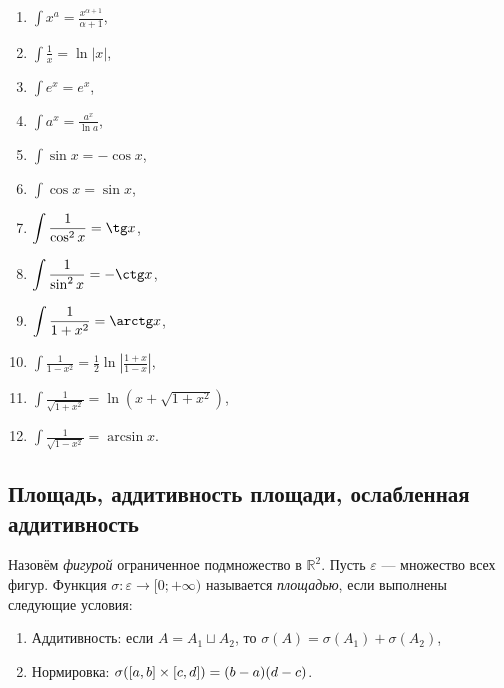 \begin{multicols}{2}
	\begin{enumerate}
		\item \(\displaystyle \int x^a = \frac{x^{\alpha+1}}{\alpha + 1}\),
		\item \(\displaystyle \int \frac{1}{x} = \ln |x|\),
		\item \(\displaystyle \int e^x = e^x\),
		\item \(\displaystyle \int a^x = \frac{a^x}{\ln a}\),
		\item \(\displaystyle \int \sin x = -\cos x\),
		\item \(\displaystyle \int \cos x = \sin x\),
		\item \(\displaystyle \int \frac{1}{\cos^2 x} = \tg x\),
		\item \(\displaystyle \int \frac{1}{\sin^2 x} = -\ctg x\),
		\item \(\displaystyle \int \frac{1}{1 + x^2} = \arctg x\),
		\item \(\displaystyle \int \frac{1}{1 - x^2} = \frac{1}{2} \ln \left|\frac{1 + x}{1 - x} \right|\),
		\item \(\displaystyle \int \frac{1}{\sqrt{1 + x^2}} = \ln \left(x + \sqrt{1 + x^2} \right)\),
		\item \(\displaystyle \int \frac{1}{\sqrt{1 - x^2}} = \arcsin x\).
	\end{enumerate}
\end{multicols}

\subsection{Площадь, аддитивность площади, ослабленная аддитивность}

\begin{ndefinition}
	Назовём \textit{фигурой} ограниченное подмножество в $\mathbb{R}^2$.
	Пусть $\varepsilon$ --- множество всех фигур. Функция $\sigma \colon \varepsilon \to [0; +\infty)$ называется \textit{площадью},
	если выполнены следующие условия:
	\begin{enumerate}
		\item Аддитивность: если $A = A_1 \sqcup A_2$, то $\sigma (A) = \sigma (A_1) + \sigma (A_2)$,
		\item Нормировка: $\hbox{$\sigma ([a, b] \times [c, d])$} = (b - a) (d - c)$.
	\end{enumerate}
\end{ndefinition}

